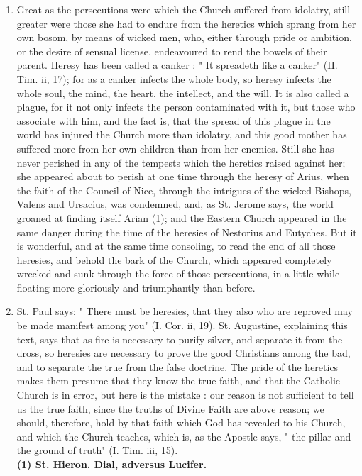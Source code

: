 \documentclass[12pt]{book}
\begin{document}
\begin{enumerate}
\item Great as the persecutions were which the Church suffered from idolatry, still greater were those she
had to endure from the heretics which sprang from her own bosom, by means of wicked men, who, either
through pride or ambition, or the desire of sensual license, endeavoured to rend the bowels of their
parent. Heresy has been called a canker : " It spreadeth like a canker" (II. Tim. ii, 17); for as a canker
infects the whole body, so heresy infects the whole soul, the mind, the heart, the intellect, and the will. It
is also called a plague, for it not only infects the person contaminated with it, but those who associate
with him, and the fact is, that the spread of this plague in the world has injured the Church more than
idolatry, and this good mother has suffered more from her own children than from her enemies. Still she
has never perished in any of the tempests which the heretics raised against her; she appeared about to
perish at one time through the heresy of Arius, when the faith of the Council of Nice, through the
intrigues of the wicked Bishops, Valens and Ursacius, was condemned, and, as St. Jerome says, the world
groaned at finding itself Arian (1); and the Eastern Church appeared in the same danger during the time
of the heresies of Nestorius and Eutyches. But it is wonderful, and at the same time consoling, to read the
end of all those heresies, and behold the bark of the Church, which appeared completely wrecked and
sunk through the force of those persecutions, in a little while floating more gloriously and triumphantly
than before.

\item St. Paul says: " There must be heresies, that they also who are reproved may be made manifest among
you" (I. Cor. ii, 19). St. Augustine, explaining this text, says that as fire is necessary to purify silver, and
separate it from the dross, so heresies are necessary to prove the good Christians among the bad, and to
separate the true from the false doctrine. The pride of the heretics makes them presume that they know
the true faith, and that the Catholic Church is in error, but here is the mistake : our reason is not sufficient
to tell us the true faith, since the truths of Divine Faith are above reason; we should, therefore, hold by
that faith which God has revealed to his Church, and which the Church teaches, which is, as the Apostle
says, " the pillar and the ground of truth" (I. Tim. iii, 15).\\
\textbf{(1) St. Hieron. Dial, adversus Lucifer.}\\


\end{enumerate}
\end{document}
